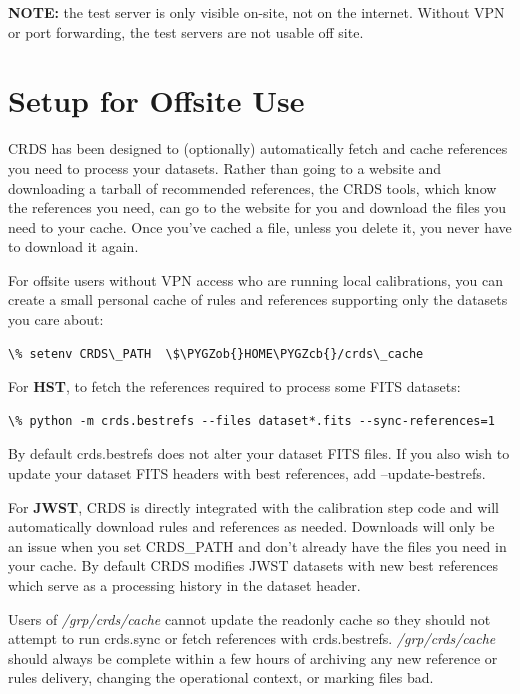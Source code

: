 \documentclass[letterpaper,10pt,english]{sphinxmanual}
\def\PYGZob{\char`\{}
\def\PYGZcb{\char`\}}
\begin{document}
\textbf{NOTE:} the test server is only visible on-site,  not on the internet.  Without VPN or port forwarding,  the test
servers are not usable off site.


\section{Setup for Offsite Use}
\label{installation:setup-for-offsite-use}
CRDS has been designed to (optionally) automatically fetch and cache references you need to process your datasets.
Rather than going to a website and downloading a tarball of recommended references,  the CRDS tools,  which know
the references you need,  can go to the website for you and download the files you need to your cache.  Once you've
cached a file,  unless you delete it,  you never have to download it again.

For offsite users without VPN access who are running local calibrations,  you can create a small personal
cache of rules and references supporting only the datasets you care about:

\begin{Verbatim}[commandchars=\\\{\}]
\% setenv CRDS\_PATH  \$\PYGZob{}HOME\PYGZcb{}/crds\_cache
\end{Verbatim}

For \textbf{HST}, to fetch the references required to process some FITS datasets:

\begin{Verbatim}[commandchars=\\\{\}]
\% python -m crds.bestrefs --files dataset*.fits --sync-references=1
\end{Verbatim}

By default crds.bestrefs does not alter your dataset FITS files.   If you also wish to update your dataset FITS
headers with best references,  add --update-bestrefs.

For \textbf{JWST},  CRDS is directly integrated with the calibration step code and will automatically download
rules and references as needed.   Downloads will only be an issue when you set CRDS\_PATH and don't already
have the files you need in your cache.   By default CRDS modifies JWST datasets with new best references
which serve as a processing history in the dataset header.

Users of \emph{/grp/crds/cache} cannot update the readonly cache so they should not attempt to run crds.sync or
fetch references with crds.bestrefs.  \emph{/grp/crds/cache} should always be complete within a few hours of archiving
any new reference or rules delivery,  changing the operational context,  or marking files bad.
\end{document}
